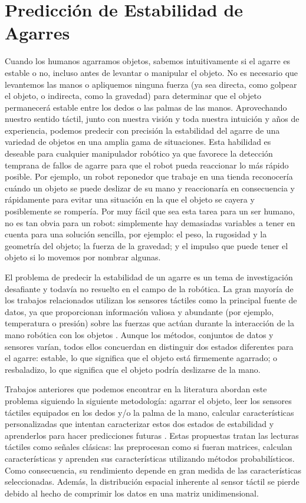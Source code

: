 \chapter{Predicción de Estabilidad de Agarres}

Cuando los humanos agarramos objetos, sabemos intuitivamente si el agarre es estable o no, incluso antes de levantar o manipular el objeto. No es necesario que levantemos las manos o apliquemos ninguna fuerza (ya sea directa, como golpear el objeto, o indirecta, como la gravedad) para determinar que el objeto permanecerá estable entre los dedos o las palmas de las manos. Aprovechando nuestro sentido táctil, junto con nuestra visión y toda nuestra intuición y años de experiencia, podemos predecir con precisión la estabilidad del agarre de una variedad de objetos en una amplia gama de situaciones. Esta habilidad es deseable para cualquier manipulador robótico ya que favorece la detección temprana de fallos de agarre para que el robot pueda reaccionar lo más rápido posible. Por ejemplo, un robot reponedor que trabaje en una tienda reconocería cuándo un objeto se puede deslizar de su mano y reaccionaría en consecuencia y rápidamente para evitar una situación en la que el objeto se cayera y posiblemente se rompería. Por muy fácil que sea esta tarea para un ser humano, no es tan obvia para un robot: simplemente hay demasiadas variables a tener en cuenta para una solución sencilla, por ejemplo: el peso, la rugosidad y la geometría del objeto; la fuerza de la gravedad; y el impulso que puede tener el objeto si lo movemos por nombrar algunas.

El problema de predecir la estabilidad de un agarre es un tema de investigación desafiante y todavía no resuelto en el campo de la robótica. La gran mayoría de los trabajos relacionados utilizan los sensores táctiles como la principal fuente de datos, ya que proporcionan información valiosa y abundante (por ejemplo, temperatura o presión) sobre las fuerzas que actúan durante la interacción de la mano robótica con los objetos \cite{Kappassov2015}. Aunque los métodos, conjuntos de datos y sensores varían, todos ellos concuerdan en distinguir dos estados diferentes para el agarre: estable, lo que significa que el objeto está firmemente agarrado; o resbaladizo, lo que significa que el objeto podría deslizarse de la mano.

Trabajos anteriores que podemos encontrar en la literatura abordan este problema siguiendo la siguiente metodología: agarrar el objeto, leer los sensores táctiles equipados en los dedos y/o la palma de la mano, calcular características personalizadas que intentan caracterizar estos dos estados de estabilidad y aprenderlos para hacer predicciones futuras \cite{Li2014b,Dang2014,Su2015b,Veiga2015}. Estas propuestas tratan las lecturas táctiles como señales clásicas: las preprocesan como si fueran matrices, calculan características y aprenden sus características utilizando métodos probabilísticos. Como consecuencia, su rendimiento depende en gran medida de las características seleccionadas. Además, la distribución espacial inherente al sensor táctil se pierde debido al hecho de comprimir los datos en una matriz unidimensional.


